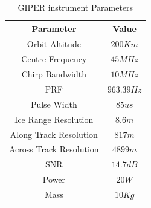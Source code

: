 \begin{table}[H]
\centering
\caption{\ac{GIPER} instrument Parameters }
\label{tab:parameter}
\begin{tabular}{|c|c|}
\hline 	\textbf{Parameter}		&  \textbf{Value}\\ 
\hline  Orbit Altitude			&  $200 Km$	\\ 
\hline  Centre Frequency		&  $45 MHz$		\\ 
\hline  Chirp Bandwidth			&  $10 MHz$		\\
\hline  PRF						&  $963.39 Hz$	\\  
\hline  Pulse Width				&  $85 us$		\\ 
\hline  Ice Range Resolution	&  $8.6 m$		\\
\hline  Along Track Resolution	&  $817 m$		\\ 
\hline  Across Track Resolution	&  $4899 m$		\\ 
\hline  SNR						&  $14.7 dB$	\\ 
\hline  Power					&  $20 W$		\\ 
\hline  Mass					&  $10 Kg$		\\ 
\hline 
\end{tabular} 
\end{table}
